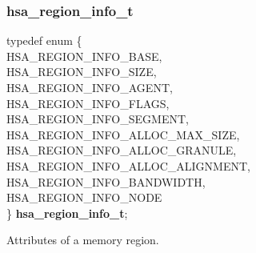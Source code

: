 \documentclass[final,oneside]{book}
\newcommand{\reftyp}[1]{#1}
\newcommand{\refenu}[1]{\reftyp{#1}}
\newenvironment{mylongtable}{\rowcolors{0}{lightgray}{lightgray}\longtable} {
\endlongtable}
\begin{document}
\subsubsection{hsa_\-region_\-info_\-t}
\vspace{-5.5mm}\begin{mylongtable}{@{}p{\textwidth}}
\rule{0pt}{3ex}typedef enum \{\\\hspace{1.7em}\hypertarget{group__memory_1ggad35755078ff15f645c6c25e7f7ef2707af5033c8ce5609f9055ae0624e04d1c83}{\refenu{HSA_\-REGION_\-INFO_\-BASE}},\\
\hspace{1.7em}\hypertarget{group__memory_1ggad35755078ff15f645c6c25e7f7ef2707a09403f5c83497726504523694b3e86b6}{\refenu{HSA_\-REGION_\-INFO_\-SIZE}},\\
\hspace{1.7em}\hypertarget{group__memory_1ggad35755078ff15f645c6c25e7f7ef2707a92bbdc9ec69d5ed54ea37b4b5c3be58e}{\refenu{HSA_\-REGION_\-INFO_\-AGENT}},\\
\hspace{1.7em}\hypertarget{group__memory_1ggad35755078ff15f645c6c25e7f7ef2707a97869505d019b0800355cab4a21c3403}{\refenu{HSA_\-REGION_\-INFO_\-FLAGS}},\\
\hspace{1.7em}\hypertarget{group__memory_1ggad35755078ff15f645c6c25e7f7ef2707ab2701b5deebcf46596e8f070f6ef27b6}{\refenu{HSA_\-REGION_\-INFO_\-SEGMENT}},\\
\hspace{1.7em}\hypertarget{group__memory_1ggad35755078ff15f645c6c25e7f7ef2707ab846101a22f46f61e0caf1d73cedd414}{\refenu{HSA_\-REGION_\-INFO_\-ALLOC_\-MAX_\-SIZE}},\\
\hspace{1.7em}\hypertarget{group__memory_1ggad35755078ff15f645c6c25e7f7ef2707ab602c01f90962314de88fb887b6f13b3}{\refenu{HSA_\-REGION_\-INFO_\-ALLOC_\-GRANULE}},\\
\hspace{1.7em}\hypertarget{group__memory_1ggad35755078ff15f645c6c25e7f7ef2707af3103bc1328080b236a7847f1bf4998e}{\refenu{HSA_\-REGION_\-INFO_\-ALLOC_\-ALIGNMENT}},\\
\hspace{1.7em}\hypertarget{group__memory_1ggad35755078ff15f645c6c25e7f7ef2707a77389057885a6a331863536fe4c66a5c}{\refenu{HSA_\-REGION_\-INFO_\-BANDWIDTH}},\\
\hspace{1.7em}\hypertarget{group__memory_1ggad35755078ff15f645c6c25e7f7ef2707ab7bb10ceec7634e32c7ad29e6b4a31a0}{\refenu{HSA_\-REGION_\-INFO_\-NODE}}\\
\} \hypertarget{group__memory_1gad35755078ff15f645c6c25e7f7ef2707}{\textbf{hsa_\-region_\-info_\-t}};\rule[-2ex]{0pt}{0pt}\end{mylongtable}
\vspace{-5mm}Attributes of a memory region.
\end{document}
